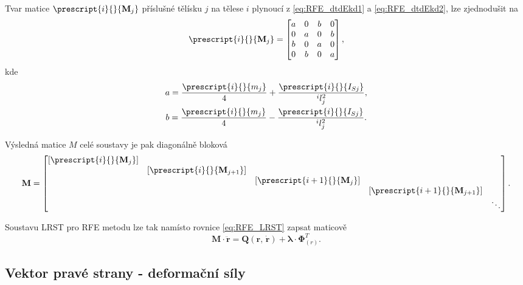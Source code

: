 Tvar matice $ \prescript{i}{}{\mathbf{M}_j} $ příslušné tělísku $ j $ na tělese $ i $ plynoucí z \ref{eq:RFE_dtdEkd1} a \ref{eq:RFE_dtdEkd2}, lze zjednodušit na
\begin{equation}\label{eq:RFE_iMj}
	\prescript{i}{}{\mathbf{M}_j} =
	\begin{bmatrix}
		a & 0 & b & 0 \\
		0 & a & 0 & b \\
		b & 0 & a & 0 \\
		0 & b & 0 & a \\
	\end{bmatrix},
\end{equation}
kde 
\begin{gather*}
	a = \frac{\prescript{i}{}{m_j}}{4} + \frac{\prescript{i}{}{I_{Sj}}}{^{i}l_{j}^2} ,\\
	b = \frac{\prescript{i}{}{m_j}}{4} - \frac{\prescript{i}{}{I_{Sj}}}{^{i}l_{j}^2}.
\end{gather*}

Výsledná matice $ M $ celé soustavy je pak diagonálně bloková
\begin{equation}\label{eq:RFE_M}
	\mathbf{M} = 
	\begin{bmatrix}
		\left[ \prescript{i}{}{\mathbf{M}_j} \right] & & & &\\	
		& \left[ \prescript{i}{}{\mathbf{M}_{j+1}} \right] & & &\\
		& & \left[ \prescript{i+1}{}{\mathbf{M}_j} \right] & &\\
		& & & \left[ \prescript{i+1}{}{\mathbf{M}_{j+1}} \right] &\\
		& & & & \ddots\\
	\end{bmatrix}.
\end{equation}

Soustavu LRST pro RFE metodu lze tak namísto rovnice \ref{eq:RFE_LRST} zapsat maticově
\begin{equation}\label{eq:RFE_LRSTmaticove}
	\mathbf{M}\cdot \mathbf{\ddot{r}}=\mathbf{Q}\left(\mathbf{r},\,\mathbf{\dot{r}}\right) + \mathbf{\lambda}\cdot \mathbf{\Phi}^{T}_{(r)} .
\end{equation}

\subsection{Vektor pravé strany - deformační síly}

